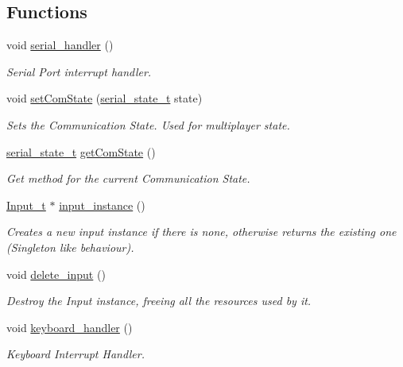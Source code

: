 \subsection*{Functions}
\begin{DoxyCompactItemize}
\item 
void \hyperlink{group___input_gad26ccb83dbd3f35a93e991343682b843}{serial\+\_\+handler} ()
\begin{DoxyCompactList}\small\item\em Serial Port interrupt handler. \end{DoxyCompactList}\item 
void \hyperlink{group___input_gaaf4cb27460e9e5bfa6f46343518e89bf}{set\+Com\+State} (\hyperlink{group___input_gad2eda33b1d20e895223c0ebbb339bde8}{serial\+\_\+state\+\_\+t} state)
\begin{DoxyCompactList}\small\item\em Sets the Communication State. Used for multiplayer state. \end{DoxyCompactList}\item 
\hyperlink{group___input_gad2eda33b1d20e895223c0ebbb339bde8}{serial\+\_\+state\+\_\+t} \hyperlink{group___input_gadf520a08e359e983d9cfb73a8b714fc2}{get\+Com\+State} ()
\begin{DoxyCompactList}\small\item\em Get method for the current Communication State. \end{DoxyCompactList}\item 
\hyperlink{struct_input__t}{Input\+\_\+t} $\ast$ \hyperlink{group___input_ga8221771f8f04f39255e0b9f577c080e9}{input\+\_\+instance} ()
\begin{DoxyCompactList}\small\item\em Creates a new input instance if there is none, otherwise returns the existing one (Singleton like behaviour). \end{DoxyCompactList}\item 
void \hyperlink{group___input_ga35566b6193e5c1d1a515b309900efe82}{delete\+\_\+input} ()
\begin{DoxyCompactList}\small\item\em Destroy the Input instance, freeing all the resources used by it. \end{DoxyCompactList}\item 
void \hyperlink{group___input_ga2f4098fc71cbd39422c1001d66970bf5}{keyboard\+\_\+handler} ()
\begin{DoxyCompactList}\small\item\em Keyboard Interrupt Handler. \end{DoxyCompactList}\item 

\end{DoxyCompactItemize}
